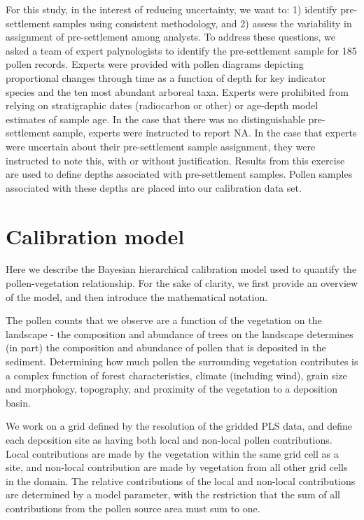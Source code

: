 \documentclass[12pt]{article}
\begin{document}
For this study, in the interest of reducing uncertainty, we want to:
1) identify pre-settlement samples using consistent methodology, and
2) assess the variability in assignment of pre-settlement among
analysts. To address these questions, we asked a team of expert
palynologists to identify the pre-settlement sample for 185 pollen
records. Experts were provided with pollen diagrams depicting
proportional changes through time as a function of depth for key
indicator species and the ten most abundant arboreal taxa. Experts
were prohibited from relying on stratigraphic dates (radiocarbon or
other) or age-depth model estimates of sample age. In the case that
there was no distinguishable pre-settlement sample, experts were
instructed to report NA. In the case that experts were uncertain about
their pre-settlement sample assignment, they were instructed to note
this, with or without justification. Results from this exercise are
used to define depths associated with pre-settlement samples. Pollen
samples associated with these depths are placed into our calibration
data set.

\section{Calibration model}

Here we describe the Bayesian hierarchical calibration model used to
quantify the pollen-vegetation relationship. For the sake of clarity,
we first provide an overview of the model, and then introduce the
mathematical notation.

The pollen counts that we observe are a function of the vegetation on
the landscape - the composition and abundance of trees on the
landscape determines (in part) the composition and abundance of pollen
that is deposited in the sediment. Determining how much pollen the
surrounding vegetation contributes is a complex function of forest
characteristics, climate (including wind), grain size and morphology,
topography, and proximity of the vegetation to a deposition basin.

We work on a grid defined by the resolution of the gridded PLS data,
and define each deposition site as having both local and non-local
pollen contributions. Local contributions are made by the vegetation
within the same grid cell as a site, and non-local contribution are
made by vegetation from all other grid cells in the domain. The
relative contributions of the local and non-local contributions are
determined by a model parameter, with the restriction that the sum of
all contributions from the pollen source area must sum to one.
\end{document}
